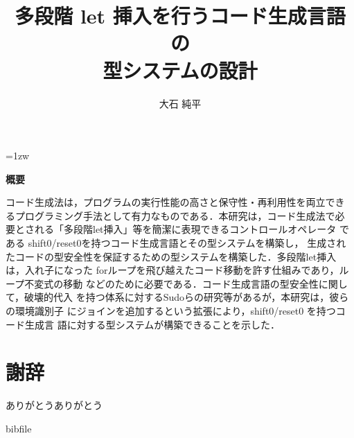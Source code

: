 \documentclass[a4paper,11pt]{jreport}
\title{多段階 let 挿入を行うコード生成言語の\\型システムの設計}
\author{大石 純平}
\begin{document}
\maketitle
\thispagestyle{empty}
\newpage

\thispagestyle{empty}
\vspace*{20pt plus 1fil}
\parindent=1zw
\noindent
\begin{center}
  {\bf 概要}
  \vspace{5mm}
\end{center}
コード生成法は，プログラムの実行性能の高さと保守性・再利用性を両立でき
るプログラミング手法として有力なものである．本研究は，コード生成法で必
要とされる「多段階let挿入」等を簡潔に表現できるコントロールオペレータ
である shift0/reset0を持つコード生成言語とその型システムを構築し，
生成されたコードの型安全性を保証するための型システムを構築した．多段階let挿入は，入れ子になった
forループを飛び越えたコード移動を許す仕組みであり，ループ不変式の移動
などのために必要である．コード生成言語の型安全性に関して，破壊的代入
を持つ体系に対するSudoらの研究等があるが，本研究は，彼らの環境識別子
にジョインを追加するという拡張により，shift0/reset0 を持つコード生成言
語に対する型システムが構築できることを示した．

\par
\vspace{0pt plus 1fil}
\newpage

\tableofcontents
\listoffigures

\pagebreak \setcounter{page}{1}










\chapter*{謝辞}
ありがとうありがとう
\newpage

\renewcommand{\bibname}{参考文献}

 {bibfile}
\end{document}

